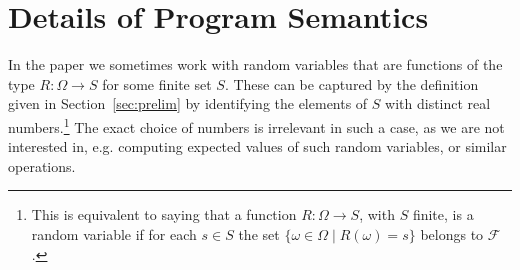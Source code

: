 \section{Details of Program Semantics}


\begin{remark}
In the paper we sometimes work with random variables 
that are functions of the type $R\colon\Omega \rightarrow S$ for some finite 
set $S$. These can be captured by the definition given in 
Section~\ref{sec:prelim} by identifying the 
elements of $S$ with distinct real numbers.\footnote{This is equivalent to 
saying that a function $R\colon \Omega\rightarrow S$, with $S$ finite, is a 
random variable if for each $s\in S$ the set $\{\omega\in \Omega\mid 
R(\omega)=s\}$ belongs to $\mathcal{F}$.} The exact choice of numbers is 
irrelevant in such a case, as we are not interested in, e.g. computing expected 
values of such random variables, or similar operations. 
\end{remark}


